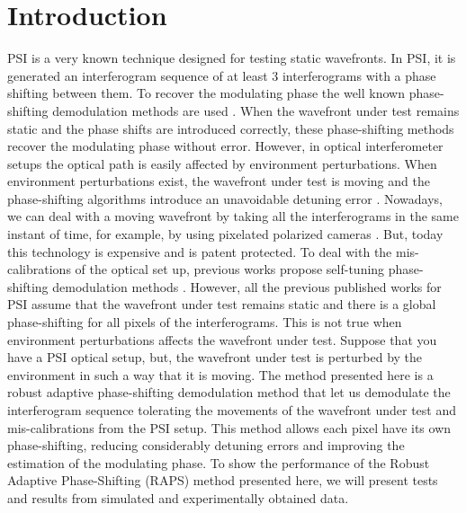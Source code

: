 \section{Introduction}
PSI is a very known technique designed for
testing static wavefronts. In PSI, it is generated an interferogram sequence of
at least 3 interferograms with a phase shifting between them. To recover the
modulating phase the well known phase-shifting demodulation methods are used
\cite{Bruning:74,Morgan,Schwider:83,Cheng:85,Hariharan:87,Estrada:09}. When the
wavefront under test remains static and the phase
shifts are introduced correctly, these phase-shifting methods recover the
modulating phase without error. However, in optical interferometer setups the
optical path is easily affected by environment perturbations. When environment
perturbations exist, the wavefront under test is moving and the phase-shifting
algorithms introduce an unavoidable detuning error
\cite{Servin:09,GeneralTheory}. Nowadays, we can deal
with a moving wavefront by taking all the interferograms in the same instant of
time, for example, by using pixelated polarized cameras \cite{Servin:10,
Kimbrough:06}. But, today this technology is expensive and is patent protected.
To deal with the mis-calibrations of the optical set up, previous works propose
self-tuning phase-shifting demodulation methods
\cite{Xu:06,Wang:04,Estrada:10}. However, all the previous
published works for PSI assume that the wavefront under test remains static and
there is a global phase-shifting for all pixels of the interferograms. This is
not true when environment perturbations affects the wavefront under test.
Suppose that you have a PSI optical setup, but, the wavefront under test is
perturbed by the environment in such a way that it is moving. The method
presented here is a robust adaptive phase-shifting demodulation method that let
us demodulate the interferogram sequence tolerating the movements of the
wavefront under test and mis-calibrations from the PSI setup. This method allows
each pixel have its own phase-shifting, reducing considerably detuning errors
and improving the estimation of the modulating phase. To show the performance of
the Robust Adaptive Phase-Shifting (RAPS) method presented here, we will present
tests and results from simulated and experimentally obtained data.


